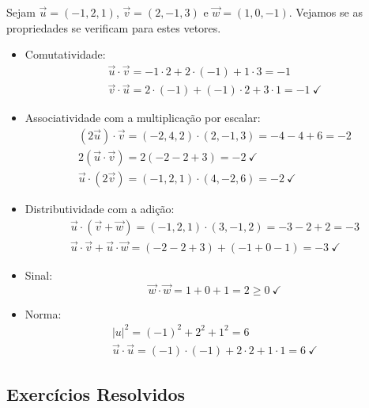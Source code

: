 \begin{ex}
  Sejam $\vec{u}=(-1,2,1)$, $\vec{v}=(2,-1,3)$ e $\vec{w}=(1,0,-1)$. Vejamos se as propriedades se verificam para estes vetores.
  \begin{itemize}
  \item Comutatividade:
    \begin{gather}
      \vec{u}\cdot\vec{v} = -1\cdot 2 + 2\cdot (-1) + 1\cdot 3 = -1\\
      \vec{v}\cdot\vec{u} = 2\cdot(-1) + (-1)\cdot 2 + 3\cdot 1 = -1~\checkmark
    \end{gather}
  \item Associatividade com a multiplicação por escalar:
    \begin{gather}
      (2\vec{u})\cdot\vec{v} = (-2,4,2)\cdot(2,-1,3) = -4-4+6=-2\\
      2(\vec{u}\cdot\vec{v}) = 2(-2-2+3) = -2~\checkmark\\
      \vec{u}\cdot(2\vec{v}) = (-1,2,1)\cdot(4,-2,6) = -2~\checkmark
    \end{gather}
  \item Distributividade com a adição:
    \begin{gather}
      \vec{u}\cdot(\vec{v}+\vec{w}) = (-1,2,1)\cdot(3,-1,2) = -3-2+2=-3\\
      \vec{u}\cdot\vec{v}+\vec{u}\cdot\vec{w} = (-2-2+3)+(-1+0-1) = -3~\checkmark
    \end{gather}
  \item Sinal:
    \begin{equation}
      \vec{w}\cdot\vec{w} = 1+0+1 = 2 \geq 0~\checkmark
    \end{equation}
  \item Norma:
    \begin{gather}
      |u|^2 = (-1)^2+2^2+1^2 = 6\\
      \vec{u}\cdot\vec{u} = (-1)\cdot(-1)+2\cdot 2+1\cdot 1 = 6~\checkmark
    \end{gather}
  \end{itemize}
\end{ex}

\subsection{Exercícios Resolvidos}

